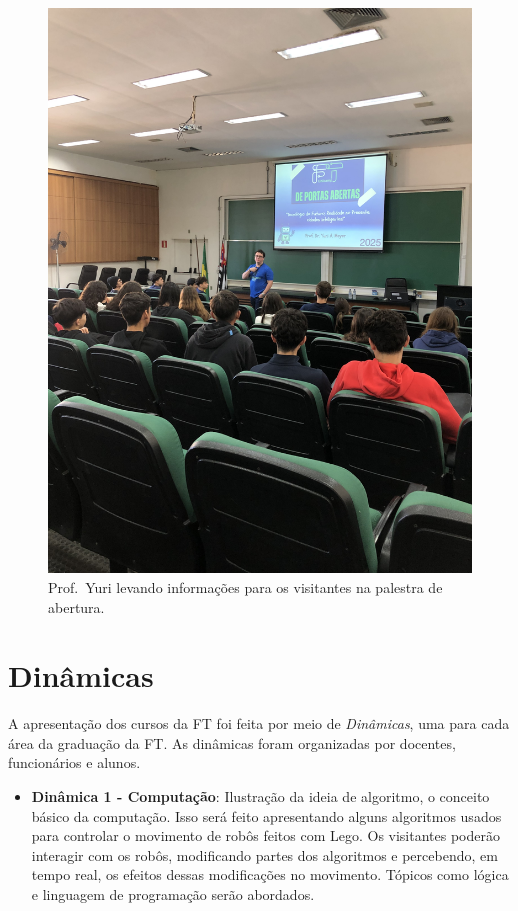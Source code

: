 \documentclass[
  letterpaper,
  DIV=11,
  numbers=noendperiod]{scrreprt}
\providecommand{\tightlist}{%
  \setlength{\itemsep}{0pt}\setlength{\parskip}{0pt}}\usepackage{longtable,booktabs,array}
\begin{document}
\begin{figure}[H]

{\centering \includegraphics[width=0.6\linewidth,height=\textheight,keepaspectratio]{planejamento/palestra-abertura.jpg}

}

\caption{Prof.~Yuri levando informações para os visitantes na palestra
de abertura.}

\end{figure}%

\section{Dinâmicas}\label{dinuxe2micas}

A apresentação dos cursos da FT foi feita por meio de \emph{Dinâmicas},
uma para cada área da graduação da FT. As dinâmicas foram organizadas
por docentes, funcionários e alunos.

\begin{itemize}
\tightlist
\item
  \textbf{Dinâmica 1 - Computação}: Ilustração da ideia de algoritmo, o
  conceito básico da computação. Isso será feito apresentando alguns
  algoritmos usados para controlar o movimento de robôs feitos com Lego.
  Os visitantes poderão interagir com os robôs, modificando partes dos
  algoritmos e percebendo, em tempo real, os efeitos dessas modificações
  no movimento. Tópicos como lógica e linguagem de programação serão
  abordados.
\end{itemize}
\end{document}
